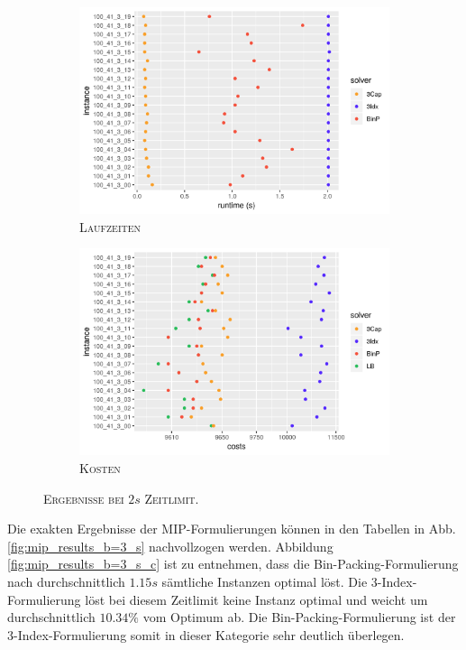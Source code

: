 \begin{figure}[H]
\centering
\begin{subfigure}[b]{0.47\textwidth}
\centering
\includegraphics[width=1.1\textwidth]{img/solver_instance_time_b=3_s_2s.png}
\caption{\textsc{Laufzeiten}}
\label{fig:b=3_s_runtimes}
\end{subfigure}
\hfill
\begin{subfigure}[b]{0.47\textwidth}
\centering
\includegraphics[width=1.1\textwidth]{img/solver_instance_cost_b=3_s_2s.png}
\caption{\textsc{Kosten}}
\label{fig:b=3_s_costs}
\end{subfigure}
\caption{\textsc{Ergebnisse bei $2s$ Zeitlimit}.}
\end{figure}

Die exakten Ergebnisse der MIP-Formulierungen können in den Tabellen in Abb. \ref{fig:mip_results_b=3_s} nachvollzogen werden. Abbildung \ref{fig:mip_results_b=3_s_c} ist zu entnehmen, dass die Bin-Packing-Formulierung nach
durchschnittlich $1.15s$ sämtliche Instanzen optimal löst. Die 3-Index-Formulierung löst bei diesem Zeitlimit keine Instanz optimal und weicht um durchschnittlich $10.34 \%$ vom Optimum ab.
Die Bin-Packing-Formulierung ist der 3-Index-Formulierung somit in dieser Kategorie sehr deutlich überlegen.

